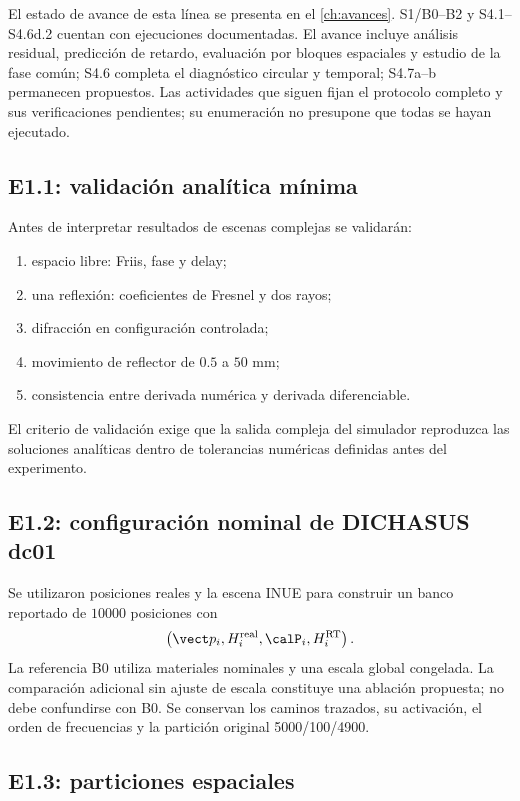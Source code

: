El estado de avance de esta línea se presenta en el \cref{ch:avances}. S1/B0--B2 y S4.1--S4.6d.2 cuentan con ejecuciones documentadas. El avance incluye análisis residual, predicción de retardo, evaluación por bloques espaciales y estudio de la fase común; S4.6 completa el diagnóstico circular y temporal; S4.7a--b permanecen propuestos. Las actividades que siguen fijan el protocolo completo y sus verificaciones pendientes; su enumeración no presupone que todas se hayan ejecutado.

\subsection{E1.1: validación analítica mínima}

Antes de interpretar resultados de escenas complejas se validarán:
\begin{enumerate}
\item espacio libre: Friis, fase y delay;
\item una reflexión: coeficientes de Fresnel y dos rayos;
\item difracción en configuración controlada;
\item movimiento de reflector de $0.5$ a $50$ mm;
\item consistencia entre derivada numérica y derivada diferenciable.
\end{enumerate}
El criterio de validación exige que la salida compleja del simulador reproduzca las soluciones analíticas dentro de tolerancias numéricas definidas antes del experimento.

\subsection{E1.2: configuración nominal de DICHASUS dc01}

Se utilizaron posiciones reales y la escena INUE para construir un banco reportado de $10000$ posiciones con
\begin{equation}
\left(\vect p_i,H_i^{\rm real},\calP_i,H_i^{\rm RT}\right).
\end{equation}
La referencia B0 utiliza materiales nominales y una escala global congelada. La comparación adicional sin ajuste de escala constituye una ablación propuesta; no debe confundirse con B0. Se conservan los caminos trazados, su activación, el orden de frecuencias y la partición original 5000/100/4900.

\subsection{E1.3: particiones espaciales}

